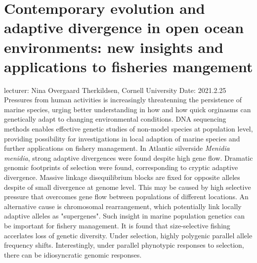 \documentclass[11pt]{article}
\begin{document}
  \section{Contemporary evolution and adaptive divergence in open ocean environments: new insights and applications to fisheries mangement}
  lecturer: Nina Overgaard Therkildsen, Cornell University
  \newline
  Date: 2021.2.25
  \newline
  Pressures from human activities is increasingly threatenning the persistence of marine species, urging better understanding in how and how quick orginasms can genetically adapt to changing environmental conditions. 
  DNA sequencing methods enables effective genetic studies of non-model species at population level, providing possibility for investigations in local adaption of marine species and further applications on fishery management.
  \newline
  In Atlantic silverside \textit{Menidia menidia}, strong adaptive divergences were found despite high gene flow. 
  Dramatic genomic footprints of selection were found, corresponding to cryptic adaptive divergence. 
  Massive linkage disequilibrium blocks are fixed for opposite alleles despite of small divergence at genome level. 
  This may be caused by high selective pressure that overcomes gene flow between populations of different locations. 
  An alternative cause is chromosomal rearrangement, which potentially link locally adaptive alleles as "supergenes".
  \newline
  Such insight in marine population genetics can be important for fishery management. 
  It is found that size-selective fishing accerlates loss of genetic diversity. 
  Under selection, highly polygenic parallel allele frequency shifts. 
  Interestingly, under parallel phynotypic responses to selection, there can be idiosyncratic genomic responses. 

  \newpage
\end{document}
